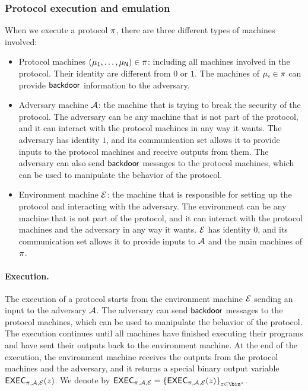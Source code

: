 \subsubsection{Protocol execution and emulation}
When we execute a protocol $\mathsf{\pi}$, there are three different types of machines involved:
\begin{itemize}
    \item Protocol machines $(\mathsf{\mu}_1, \ldots, \mathsf{\mu}_{\mathsf{N}}) \in \mathsf{\pi}$: including all machines involved in the protocol. Their identity are different from $0$ or $1$. The machines of $\mathsf{\mu}_i \in \mathsf{\pi}$ can provide $\mathsf{backdoor}$ information to the adversary.
    \item Adversary machine $\mathcal{A}$: the machine that is trying to break the security of the protocol. The adversary can be any machine that is not part of the protocol, and it can interact with the protocol machines in any way it wants. The adversary has identity $1$, and its communication set allows it to provide inputs to the protocol machines and receive outputs from them. The adversary can also send $\mathsf{backdoor}$ messages to the protocol machines, which can be used to manipulate the behavior of the protocol.
    \item Environment machine $\mathcal{E}$: the machine that is responsible for setting up the protocol and interacting with the adversary. The environment can be any machine that is not part of the protocol, and it can interact with the protocol machines and the adversary in any way it wants. $\mathcal{E}$ has identity $0$, and its communication set allows it to provide inputs to $\mathcal{A}$ and the main machines of $\mathsf{\pi}$.
\end{itemize}

\paragraph{Execution.} The execution of a protocol starts from the environment machine $\mathcal{E}$ sending an input to the adversary $\mathcal{A}$. The adversary can send $\mathsf{backdoor}$ messages to the protocol machines, which can be used to manipulate the behavior of the protocol. The execution continues until all machines have finished executing their programs and have sent their outputs back to the environment machine. At the end of the execution, the environment machine receives the outputs from the protocol machines and the adversary, and it returns a special binary output variable $\mathsf{EXEC}_{\mathsf{\pi}, \mathcal{A}, \mathcal{E}}(z)$. We denote by $\EXEC_{\Protocol, \ucAdv, \ucEnv} = \left\{\EXEC_{\Protocol, \ucAdv, \ucEnv}(z)\right\}_{z \in \bin^\star}$. 

